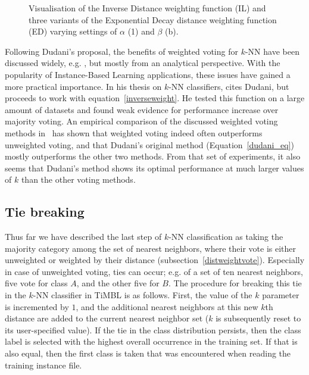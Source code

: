 \documentclass{report}
\begin{document}
\begin{figure}[htb]
        \begin{center}
                \leavevmode
                \columnwidth
                \caption{Visualisation of the Inverse Distance weighting function (IL) and three variants of the Exponential Decay distance weighting function (ED) varying settings of $\alpha$ (1) and $\beta$ (b).
                }
                \label{dist-weight-fig}
        \end{center}
\end{figure}

Following Dudani's proposal, the benefits of weighted voting for
$k$-NN have been discussed widely,
e.g. \cite{Bailey+78,Morin+81,MacLeod+87}, but mostly from an
analytical perspective. With the popularity of Instance-Based Learning
applications, these issues have gained a more practical importance. In
his thesis on $k$-NN classifiers,  cites
Dudani, but proceeds to work with equation~\ref{inverseweight}. He
tested this function on a large amount of datasets and found weak
evidence for performance increase over majority voting. An empirical
comparison of the discussed weighted voting methods in~\cite{Zavrel97}
has shown that weighted voting indeed often outperforms unweighted
voting, and that Dudani's original method (Equation~\ref{dudani_eq})
mostly outperforms the other two methods. From that set of
experiments, it also seems that Dudani's method shows its optimal
performance at much larger values of $k$ than the other voting
methods.

\subsection{Tie breaking}
\label{tiebreaking}

Thus far we have described the last step of $k$-NN classification as
taking the majority category among the set of nearest neighbors, where
their vote is either unweighted or weighted by their distance
(subsection~\ref{distweightvote}). Especially in case of unweighted
voting, ties can occur; e.g. of a set of ten nearest neighbors, five
vote for class $A$, and the other five for $B$. The procedure for
breaking this tie in the $k$-NN classifier in TiMBL is as
follows. First, the value of the $k$ parameter is incremented by $1$,
and the additional nearest neighbors at this new $k$th distance are
added to the current nearest neighbor set ($k$ is subsequently reset
to its user-specified value). If the tie in the class distribution
persists, then the class label is selected with the highest overall
occurrence in the training set. If that is also equal, then the first
class is taken that was encountered when reading the training instance
file. 
\end{document}
